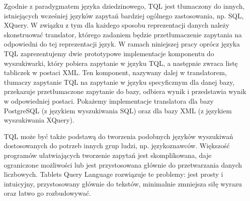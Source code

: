 Zgodnie z paradygmatem języka dziedzinowego, TQL jest tłumaczony do innych, istniejących wcześniej języków zapytań bardziej ogólnego zastosowania, np. SQL, XQuery.
W związku z tym dla każdego sposobu reprezentacji danych należy skonstruować translator, 
którego zadaniem będzie przetłumaczenie zapytania na odpowiedni do tej reprezentacji język. 
W ramach niniejszej pracy oprócz języka TQL zaprezentujemy dwie prototypowe implementacje komponentu do wyszukiwarki, który pobiera zapytanie w języku TQL, a następnie zwraca listę tabliczek w postaci XML.
Ten komponent, nazywany dalej w translatorem, tłumaczy zapytanie TQL na zapytanie w języku specyficznym dla danej bazy, przekazuje przetłumaczone zapytanie do bazy, odbiera wynik i przedstawia wynik w odpowiedniej postaci. Pokażemy implementacje translatora dla bazy PostgreSQL (z językiem wyszukiwania SQL) oraz dla bazy XML (z językiem wyszukiwania XQuery).






TQL może być także podstawą do tworzenia podobnych języków wyszukiwań dostosowanych do potrzeb innych grup ludzi, np. językoznawców.
Większość programów ułatwiających tworzenie zapytań jest skomplikowana, daje ograniczone możliwości lub jest przystosowana głównie do przetwarzania danych liczbowych. Tablets Query Language rozwiązuje te problemy: jest prosty i intuicyjny, przystosowany głównie do tekstów, minimalnie zmniejsza siłę wyrazu oraz łatwo go rozbudowywać. 




